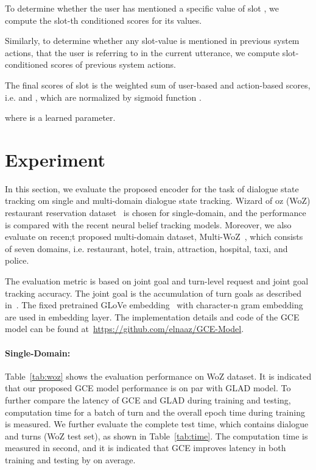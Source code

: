 \documentclass{article}
\begin{document}
To determine whether the user has mentioned a specific value of slot , we compute the slot-th conditioned scores for its values.


Similarly, to determine whether any slot-value is mentioned in previous system actions, that the user is referring to in the current utterance, we compute slot-conditioned scores of previous  system actions. 



The final scores of slot  is the weighted sum of user-based and action-based scores, i.e.  and , which are normalized by sigmoid function .

where  is a learned parameter. 


\section{Experiment}
In this section, we evaluate the proposed encoder for the task of dialogue state tracking om single and multi-domain dialogue state tracking. Wizard of oz (WoZ) restaurant reservation dataset~\cite{Wen2017ANE} is chosen for single-domain, and the performance is compared with the recent neural belief tracking models. Moreover, we also evaluate on recen;t proposed multi-domain dataset, Multi-WoZ~\citep{Budzianowski2018MultiWOZA}, which consists of seven domains, i.e. restaurant, hotel, train, attraction, hospital, taxi, and police. 

The evaluation metric is based on joint goal and turn-level request and joint goal tracking accuracy. The joint goal is the accumulation of turn goals as described in~\cite{Zhong2018GlobalLocallySD}. The fixed pretrained GLoVe embedding~\citep{pennington2014glove} with character-n gram embedding~\citep{Hashimoto2017AJM} are used in embedding layer. The implementation details and code of the GCE model can be found at~\href{url}{https://github.com/elnaaz/GCE-Model}. 

\paragraph{Single-Domain:} Table~\ref{tab:woz} shows the evaluation performance on WoZ dataset. It is indicated that our proposed GCE model performance is on par with GLAD model. To further compare the latency of GCE and GLAD during training and testing, computation time for a batch of turn and the overall epoch time during training is measured. We further evaluate the complete test time, which contains  dialogue and  turns (WoZ test set), as shown in Table~\ref{tab:time}. The computation time is measured in second, and it is indicated that GCE improves latency in both training and testing by  on average. 
\end{document}
